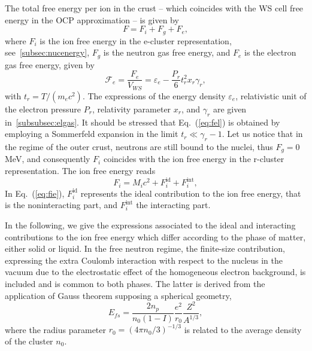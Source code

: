 The total free energy per ion in the crust -- which coincides with the WS cell
free energy in the OCP approximation -- is given by
%
\begin{equation}
  F = F_i + F_g + F_e,\label{eq:fperion}
\end{equation}
%
where $F_i$ is the ion free energy in the e-cluster representation, 
see~\ref{subsec:nucenergy}, $F_g$ is the neutron gas free energy, and $F_e$ 
is the electron gas free energy, given by~\cite{Haensel2007}
%
\begin{equation}
  \mathcal{F}_e = \frac{F_e}{V_{WS}} = \varepsilon_e -
  \frac{P_r}{6}t_r^2x_r\gamma_r,\label{eq:fel}
\end{equation}
%
with $t_r = T/(m_e c^2)$. The expressions of the energy density 
$\varepsilon_e$, relativistic unit of the electron pressure $P_r$, relativity
parameter $x_r$, and $\gamma_r$ are given in~\ref{subsubsec:elgas}. It should
be stressed that Eq.~(\ref{eq:fel}) is obtained by employing a Sommerfeld
expansion in the limit $t_r \ll \gamma_r - 1$.
Let us notice that in the regime of the outer crust, neutrons are still bound
to the nuclei, thus $F_g=0$ MeV, and consequently $F_i$ coincides with the 
ion free energy in the r-cluster representation.
The ion free energy reads
%
\begin{equation}
  F_i = M_i c^2 + F_i^{\text{id}} + F_i^{\text{int}},\label{eq:fie}
\end{equation}
%
In Eq.~(\ref{eq:fie}), $F_i^{\text{id}}$ represents the ideal contribution to
the ion free energy, that is the noninteracting part, and $F_i^{\text{int}}$
the interacting part.

In the following, we give the expressions associated to the ideal and 
interacting contributions to the ion free energy which differ according to the 
phase of matter, either solid or liquid. In the free neutron regime, the 
finite-size contribution, expressing the extra Coulomb interaction with respect
to the nucleus in the vacuum due to the electrostatic effect of the homogeneous
electron background, is included and is common to both phases. The latter 
is derived from the application of Gauss theorem supposing a spherical 
geometry,
%
\begin{equation}
  E_{fs} = \frac{2n_p}{n_0(1-I)}\frac{e^2}{r_0}\frac{Z^2}{A^{1/3}},
\end{equation}
%
where the radius parameter $r_0=(4\pi n_0/3)^{-1/3}$ is related to the average 
density of the cluster $n_0$.

